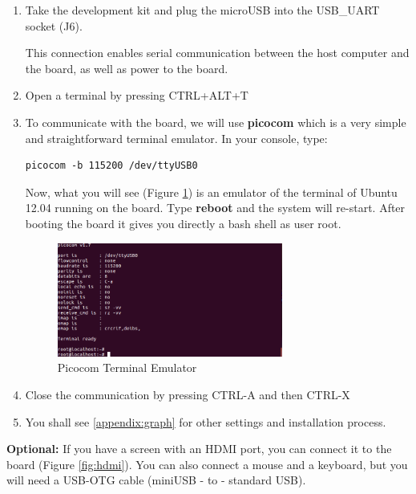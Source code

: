 \begin{enumerate}
    \item Take the development kit and plug the microUSB into the USB\_UART socket (J6).  

    This connection enables serial communication between the host computer and the board, as well as power to the board.
    
    \item Open a terminal by pressing CTRL+ALT+T
    \item To communicate with the board, we will use \textbf{picocom} which is a very simple and straightforward terminal emulator. In your console, type:
        \begin{tcolorbox}
        \begin{verbatim}
picocom -b 115200 /dev/ttyUSB0
        \end{verbatim}
        \end{tcolorbox}

    Now, what you will see (Figure \ref{fig:picocom}) is an emulator of the terminal of Ubuntu 12.04 running on the board.
    Type \textbf{reboot} and the system will re-start. After booting the board it gives you directly a bash shell as user root.


    \begin{figure}[h!]
    \centering
    \includegraphics[width=0.7\textwidth]{img/picocom.png}
    \caption{Picocom Terminal Emulator}
    \label{fig:picocom}
\end{figure}


    \item Close the communication by pressing CTRL-A and then CTRL-X

    \item You shall see  \cref{appendix:graph} for other settings and installation process.
\end{enumerate}

{\color{red} \textbf{Optional:}} If you have a screen with an HDMI port, you can connect it to the board (Figure \ref{fig:hdmi}). You can also connect a mouse and a keyboard, but you will need a USB-OTG cable (miniUSB - to - standard USB).



